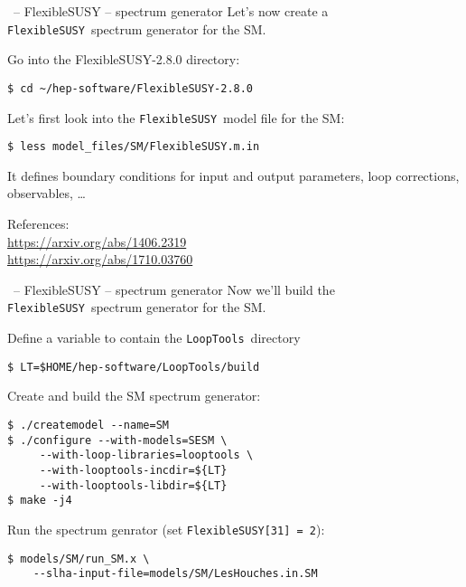 \documentclass[11pt]{beamer}
\newcommand{\FlexibleSUSY}{\texttt{FlexibleSUSY}}
\newcommand{\LoopTools}{\texttt{LoopTools}}
\begin{document}

\begin{frame}[fragile]{\insertsection\ -- FlexibleSUSY -- spectrum generator}
  Let's now create a \FlexibleSUSY\ spectrum generator for the SM.

  \bigskip

  Go into the FlexibleSUSY-2.8.0 directory:
  \begin{lstlisting}
$ cd ~/hep-software/FlexibleSUSY-2.8.0\end{lstlisting}%
  Let's first look into the \FlexibleSUSY\ model file for the SM:
  \begin{lstlisting}
$ less model_files/SM/FlexibleSUSY.m.in\end{lstlisting}%
  It defines boundary conditions for input and output parameters, loop
  corrections, observables, \ldots

  \bigskip

  References:\\
  \url{https://arxiv.org/abs/1406.2319}\\
  \url{https://arxiv.org/abs/1710.03760}

\end{frame}


\begin{frame}[fragile]{\insertsection\ -- FlexibleSUSY -- spectrum generator}
  Now we'll build the \FlexibleSUSY\ spectrum generator for the SM.

  \bigskip

  Define a variable to contain the \LoopTools\ directory
  \begin{lstlisting}
$ LT=$HOME/hep-software/LoopTools/build\end{lstlisting}%
  Create and build the SM spectrum generator:
  \begin{lstlisting}
$ ./createmodel --name=SM
$ ./configure --with-models=SESM \
     --with-loop-libraries=looptools \
     --with-looptools-incdir=${LT}
     --with-looptools-libdir=${LT}
$ make -j4\end{lstlisting}%
  Run the spectrum genrator (set \texttt{FlexibleSUSY[31] = 2}):
  \begin{lstlisting}
$ models/SM/run_SM.x \
    --slha-input-file=models/SM/LesHouches.in.SM\end{lstlisting}%
\end{frame}
\end{document}
